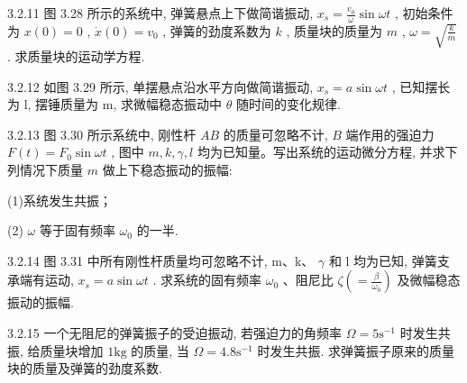 \begin{problem}{3.2.11}
图 3.28 所示的系统中, 弹簧悬点上下做简谐振动, $x_{s} = \frac{v_{0}}{\omega}\sin \omega t$ , 初始条件为 $x(0) = 0$ , $\dot{x}(0) = v_{0}$ , 弹簧的劲度系数为 $k$ , 质量块的质量为 $m$ , $\omega = \sqrt{\frac{k}{m}}$ . 求质量块的运动学方程.
\begin{center}

\end{center}
\end{problem}
\clearpage


\begin{problem}{3.2.12}
如图 3.29 所示, 单摆悬点沿水平方向做简谐振动, $x_{s}=a\sin\omega t$ , 已知摆长为 l, 摆锤质量为 m, 求微幅稳态振动中 $\theta$ 随时间的变化规律.
\begin{center}

\end{center}
\end{problem}
\clearpage


\begin{problem}{3.2.13}
图 3.30 所示系统中, 刚性杆 $AB$ 的质量可忽略不计, $B$ 端作用的强迫力 $F(t) = F_0 \sin \omega t$ , 图中 $m, k, \gamma, l$ 均为已知量。写出系统的运动微分方程, 并求下列情况下质量 $m$ 做上下稳态振动的振幅:

(1)系统发生共振；

(2) $\omega$ 等于固有频率 $\omega_0$ 的一半.
\begin{center}

\end{center}
\end{problem}
\clearpage


\begin{problem}{3.2.14}
图 3.31 中所有刚性杆质量均可忽略不计, m、k、 $\gamma$ 和 l 均为已知, 弹簧支承端有运动, $x_{s}=a\sin\omega t$ . 求系统的固有频率 $\omega_{0}$ 、阻尼比 $\zeta\left(=\frac{\beta}{\omega_{0}}\right)$ 及微幅稳态振动的振幅.
\begin{center}

\end{center}
\end{problem}
\clearpage


\begin{problem}{3.2.15}
一个无阻尼的弹簧振子的受迫振动, 若强迫力的角频率 $\Omega = 5\mathrm{s}^{-1}$ 时发生共振, 给质量块增加 $1\mathrm{kg}$ 的质量, 当 $\Omega = 4.8\mathrm{s}^{-1}$ 时发生共振. 求弹簧振子原来的质量块的质量及弹簧的劲度系数.
\end{problem}
\clearpage


